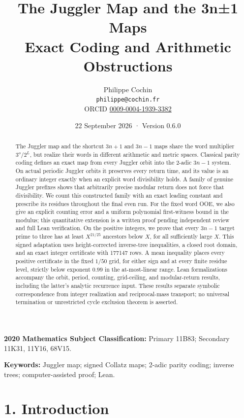 \documentclass[11pt,a4paper]{article}
\title{The Juggler Map and the 3n±1 Maps\\[0.5em]{\large Exact Coding
and Arithmetic Obstructions}}
\author{Philippe Cochin \\ \texttt{philippe@cochin.fr} \\
  \small ORCID \href{https://orcid.org/0009-0004-1939-3382}{0009-0004-1939-3382}}
\date{22 September 2026 · Version 0.6.0}
\begin{document}
\maketitle
\begin{abstract}

The Juggler map and the shortcut \(3n+1\) and \(3n-1\) maps share the
word multiplier \(3^o/2^L\), but realize their words in different
arithmetic and metric spaces. Classical parity coding defines an exact
map from every Juggler orbit into the 2-adic \(3n-1\) system. On actual
periodic Juggler orbits it preserves every return time, and its value is
an ordinary integer exactly when an explicit word divisibility holds. A
family of genuine Juggler prefixes shows that arbitrarily precise
modular return does not force that divisibility. We count this
constructed family with an exact leading constant and prescribe its
residues throughout the final even run. For the fixed word OOE, we also
give an explicit counting error and a uniform polynomial first-witness
bound in the modulus; this quantitative extension is a written proof
pending independent review and full Lean verification. On the positive
integers, we prove that every \(3n-1\) target prime to three has at
least \(X^{21/25}\) ancestors below \(X\), for all sufficiently large
\(X\). This signed adaptation uses height-corrected inverse-tree
inequalities, a closed root domain, and an exact integer certificate
with 177147 rows. A mean inequality places every positive certificate in
the fixed \(1/50\) grid, for either sign and at every finite residue
level, strictly below exponent \(0.99\) in the at-most-linear range.
Lean formalizations accompany the orbit, period, counting, grid-ceiling,
and modular-return results, including the latter's analytic recurrence
input. These results separate symbolic correspondence from integer
realization and reciprocal-mass transport; no universal termination or
unrestricted cycle exclusion theorem is asserted.

\end{abstract}

\textbf{2020 Mathematics Subject Classification:} Primary 11B83;
Secondary 11K31, 11Y16, 68V15.

\textbf{Keywords:} Juggler map; signed Collatz maps; 2-adic parity
coding; inverse trees; computer-assisted proof; Lean.

\section{1. Introduction}\label{introduction}
\end{document}
